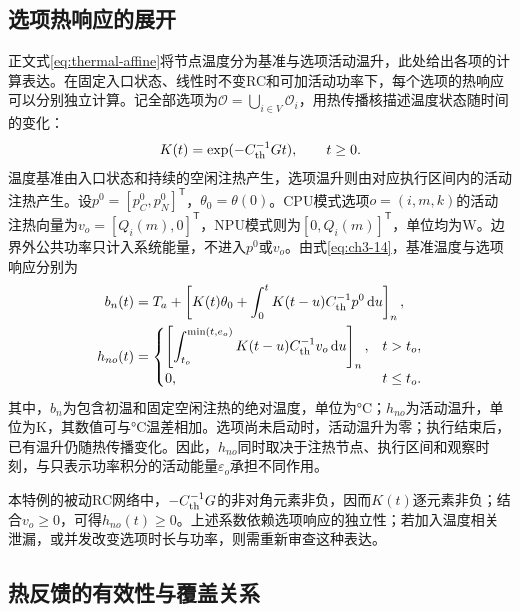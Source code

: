 \subsection*{选项热响应的展开}
\label{supp:option-response}

正文式\eqref{eq:thermal-affine}将节点温度分为基准与选项活动温升，此处给出各项的计算表达。在固定入口状态、线性时不变RC和可加活动功率下，每个选项的热响应可以分别独立计算。记全部选项为\(\mathcal O=\bigcup_{i\in V}\mathcal O_i\)，用热传播核描述温度状态随时间的变化：
\begin{equation}
K(t)=\exp(-C_{\rm th}^{-1}Gt),\qquad t\ge0.
\label{eq:thermal-kernel}
\end{equation}
温度基准由入口状态和持续的空闲注热产生，选项温升则由对应执行区间内的活动注热产生。设\(p^0=[p_C^0,p_N^0]^{\mathsf T}\)，\(\theta_0=\theta(0)\)。CPU模式选项\(o=(i,m,k)\)的活动注热向量为\(v_o=[Q_i(m),0]^{\mathsf T}\)，NPU模式则为\([0,Q_i(m)]^{\mathsf T}\)，单位均为W。边界外公共功率只计入系统能量，不进入\(p^0\)或\(v_o\)。由式\eqref{eq:ch3-14}，基准温度与选项响应分别为
\begin{equation}
\begin{aligned}
b_n(t)&=T_a+\left[K(t)\theta_0+
\int_0^t K(t-u)C_{\rm th}^{-1}p^0\,\mathrm du\right]_n,\\
h_{no}(t)&=
\begin{cases}
\displaystyle\left[\int_{t_o}^{\min(t,e_o)}
K(t-u)C_{\rm th}^{-1}v_o\,\mathrm du\right]_n,&t>t_o,\\
0,&t\le t_o.
\end{cases}
\end{aligned}
\label{eq:thermal-option-response}
\end{equation}
其中，\(b_n\)为包含初温和固定空闲注热的绝对温度，单位为°C；\(h_{no}\)为活动温升，单位为K，其数值可与°C温差相加。选项尚未启动时，活动温升为零；执行结束后，已有温升仍随热传播变化。因此，\(h_{no}\)同时取决于注热节点、执行区间和观察时刻，与只表示功率积分的活动能量\(\varepsilon_o\)承担不同作用。

本特例的被动RC网络中，\(-C_{\rm th}^{-1}G\)的非对角元素非负，因而\(K(t)\)逐元素非负；结合\(v_o\ge0\)，可得\(h_{no}(t)\ge0\)。上述系数依赖选项响应的独立性；若加入温度相关泄漏，或并发改变选项时长与功率，则需重新审查这种表达。


\subsection*{热反馈的有效性与覆盖关系}
\label{supp:feedback-properties}

